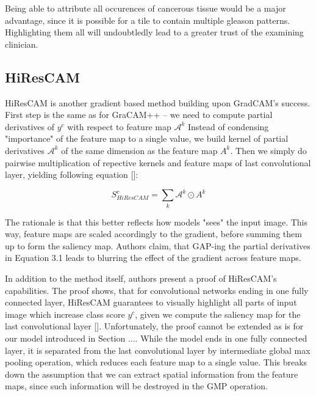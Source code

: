 
Being able to attribute all occurences of cancerous tissue would be a major advantage, since it is possible for a tile to contain multiple gleason patterns. Highlighting them all will undoubtledly lead to a greater trust of the examining clinician.

\subsection{HiResCAM}

HiResCAM is another gradient based method building upon GradCAM's success. First step is the same as for GraCAM++ -- we need to compute partial derivatives of $y^c$ with respect to feature map $\mathcal{A}^k$ Instead of condensing "importance" of the feature map to a single value, we build kernel of partial derivatives $\mathcal{A}^k$ of the same dimension as the feature map $A^k$. Then we simply do pairwise multiplication of repective kernels and feature maps of last convolutional layer, yielding following equation []: 

\begin{equation}
    S^c_{HiResCAM} = \sum_k \mathcal{A}^k \odot A^k
\end{equation}

The rationale is that this better reflects how models "sees" the input image. This way, feature maps are scaled accordingly to the gradient, before summing them up to form the saliency map. Authors claim, that GAP-ing the partial derivatives in Equation 3.1 leads to blurring the effect of the gradient across feature maps. 

In addition to the method itself, authors present a proof of HiResCAM's capabilities. The proof shows, that for convolutional networks ending in one fully connected layer, HiResCAM guarantees to visually highlight all parts of input image which increase class score $y^c$, given we compute the saliency map for the last convolutional layer []. Unfortunately, the proof cannot be extended as is for our model introduced in Section .... While the model ends in one fully connected layer, it is separated from the last convolutional layer by intermediate global max pooling operation, which reduces each feature map to a single value. This breaks down the assumption that we can extract spatial information from the feature maps, since such information will be destroyed in the GMP operation. 


